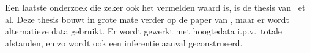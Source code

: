 Een laatste onderzoek die zeker ook het vermelden waard is, is de thesis
van~\citeauthor{Verdonck_2022} et al. Deze thesis bouwt in grote mate verder op
de paper van \citeauthor{Dhondt_Pochat_Voulimeneas_Joosen_Volckaert_2022}, maar
er wordt alternatieve data gebruikt. Er wordt gewerkt met hoogtedata i.p.v.\
totale afstanden, en zo wordt ook een inferentie aanval geconstrueerd.

